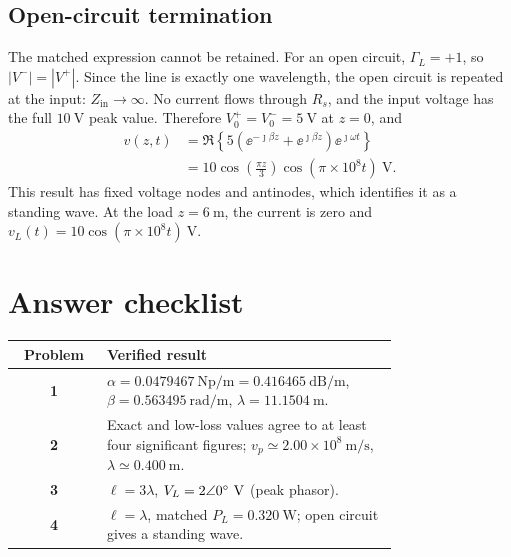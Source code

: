 \documentclass[12pt,a4paper]{article}
\begin{document}
\subsection{Open-circuit termination}

The matched expression cannot be retained.  For an open circuit,
$\Gamma_L=+1$, so $|V^-|=|V^+|$.  Since the line is exactly one wavelength,
the open circuit is repeated at the input: $Z_{\mathrm{in}}\to\infty$.
No current flows through $R_s$, and the input voltage has the full
$10~\mathrm{V}$ peak value.  Therefore $V_0^+=V_0^-=5~\mathrm{V}$ at $z=0$,
and
\begin{align}
v(z,t)&=\Re\left\{5\left(\ee^{-\jmath\beta z}
+\ee^{\jmath\beta z}\right)\ee^{\jmath\omega t}\right\}\\
&=10\cos\left(\frac{\pi z}{3}\right)
\cos(\pi\times10^8t)~\mathrm{V}.
\end{align}
This result has fixed voltage nodes and antinodes, which identifies it as a
standing wave.  At the load $z=6~\mathrm{m}$, the current is zero and
$v_L(t)=10\cos(\pi\times10^8t)~\mathrm{V}$.


\section{Answer checklist}

\begin{center}
\renewcommand{\arraystretch}{1.28}
\begin{tabular}{>{\bfseries}c p{0.76\linewidth}}
\toprule
Problem & Verified result \\
\midrule
1 & $\alpha=0.0479467~\mathrm{Np/m}=0.416465~\mathrm{dB/m}$,
$\beta=0.563495~\mathrm{rad/m}$, $\lambda=11.1504~\mathrm{m}$. \\
2 & Exact and low-loss values agree to at least four significant figures;
$v_p\simeq2.00\times10^8~\mathrm{m/s}$, $\lambda\simeq0.400~\mathrm{m}$. \\
3 & $\ell=3\lambda$, $V_L=2\angle0^{\circ}~\mathrm{V}$ (peak phasor). \\
4 & $\ell=\lambda$, matched $P_L=0.320~\mathrm{W}$; open circuit gives a
standing wave. \\
\bottomrule
\end{tabular}
\end{center}
\end{document}
